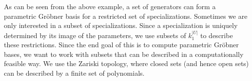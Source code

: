 





As can be seen from the above example, a set of generators can form a parametric Gröbner basis for a restricted set of specializations. Sometimes we are only interested in a subset of specializations. Since a specialization is uniquely determined by its image of the parameters, we use subsets of $k_{1}^{|U|}$ to describe these restrictions. Since the end goal of this is to compute parametric Gröbner bases, we want to work with subsets that can be described in a computationally feasible way. We use the Zariski topology, where closed sets (and hence open sets) can be described by a finite set of polynomials.

